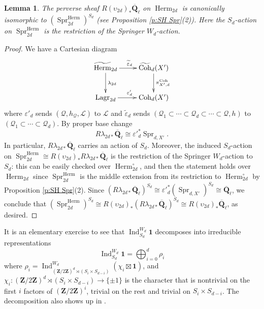 \documentclass[reqno]{amsart}
\numberwithin{equation}{section}
\newcommand{\wt}[1]{\widetilde{#1}}
\newcommand{\Q}{\mathbf{Q}}
\newcommand{\Z}{\mathbf{Z}}
\DeclareMathOperator{\Ind}{Ind}
\DeclareMathOperator{\Herm}{Herm}
\DeclareMathOperator{\Lagr}{Lagr}
\DeclareMathOperator{\Coh}{Coh}
\DeclareMathOperator{\Spr}{Spr}
\newcommand{\bt}{\boxtimes}
\newcommand{\Qlbar}{\overline{\Q}_\ell}
\newcommand\one{\mathbf{1}}
\renewcommand\c{\circ}
\newcommand{\e}{\varepsilon}
\renewcommand{\l}{\lambda}
\renewcommand{\r}{\rho}
\newcommand\cL{\mathcal{L}}
\newcommand\cQ{\mathcal{Q}}
\newtheorem{lemma}[thm]{Lemma}
\theoremstyle{remark}
\numberwithin{equation}{section}
\begin{document}
\begin{lemma}\label{l:Lag push}
The perverse sheaf $R(\upsilon_{2d})_{*}\Qlbar$ on $\Herm_{2d}$ is canonically isomorphic to $(\Spr^{\Herm}_{2d})^{S_{d}}$ (see Proposition \ref{p:SH Spr}(2)). Here the $S_{d}$-action on $\Spr^{\Herm}_{2d}$ is the restriction of the Springer $W_{d}$-action.
\end{lemma}
\begin{proof} We have a Cartesian diagram
\begin{equation}
\xymatrix{\wt\Herm_{2d}\ar[d]^{\l_{2d}} \ar[r]^{\wt\e_{d}} & \wt\Coh_{d}(X') \ar[d]^{\pi^{\Coh}_{X',d}} \\
\Lagr_{2d} \ar[r]^{\e'_{d}} & \Coh_{d}(X')
}
\end{equation}
where $\e'_{d}$ sends $(\cQ,h_{\cQ},\cL)$ to $\cL$ and $\wt\e_{d}$ sends $(\cQ_{1}\subset \cdots\subset\cQ_{d}\subset \cdots\subset \cQ,h)$ to $(\cQ_{1}\subset \cdots\subset\cQ_{d})$. By proper base change
\begin{equation}
R\l_{2d*}\Qlbar\cong \e'^{*}_{d}\Spr_{d, X'}.
\end{equation}
In particular, $R\l_{2d*}\Qlbar$ carries an action of $S_{d}$. Moreover, the induced $S_{d}$-action  on  $\Spr^{\Herm}_{2d}\cong R(\upsilon_{2d})_{*}R\l_{2d*}\Qlbar$ is  the restriction  of the Springer $W_{d}$-action to $S_{d}$:  this can be easily checked over $\Herm^{\c}_{2d}$, and then the statement holds over $\Herm_{2d}$ since $\Spr^{\Herm}_{2d}$ is the middle extension from its restriction to $\Herm^{\c}_{2d}$ by Proposition \ref{p:SH Spr}(2). Since  $(R\l_{2d*}\Qlbar)^{S_{d}}\cong \e'^{*}_{d}(\Spr_{d,X'})^{S_{d}}\cong \Qlbar$, we conclude that $(\Spr^{\Herm}_{2d})^{S_{d}}\cong R(\upsilon_{2d})_{*}(R\l_{2d*}\Qlbar)^{S_{d}}\cong R(\upsilon_{2d})_{*}\Qlbar$, as desired.
\end{proof}

It is an elementary exercise to see that $\Ind_{S_{d}}^{W_{d}}\one$ decomposes into irreducible representations
\begin{equation}\label{rho i}
\Ind_{S_{d}}^{W_{d}}\one=\bigoplus_{i=0}^{d}\r_{i}
\end{equation}
where $\r_{i}=\Ind^{W_{d}}_{(\Z/2\Z)^{d}\rtimes (S_{i}\times S_{d-i})}(\chi_{i}\bt \one)$, and $\chi_{i}: (\Z/2\Z)^{d}\rtimes (S_{i}\times S_{d-i})\to \{\pm1\}$ is the character that is nontrivial on the first $i$ factors of $(\Z/2\Z)^{i}$, trivial on the rest and trivial on $S_{i}\times S_{d-i}$.  The decomposition also shows up in \cite[\S8.1.1]{YZ}.
\end{document}
